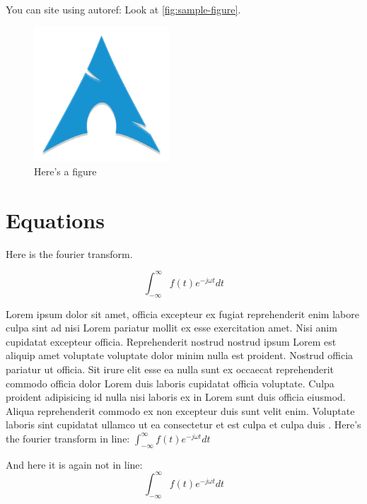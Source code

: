 \documentclass[conference]{IEEEtran}
\begin{document}
You can site using autoref: Look at \autoref{fig:sample-figure}.

\begin{figure}
  \begin{center}
    \includegraphics[width=0.45\textwidth]{./figures/arch-linux-logo-small.png}
  \end{center}
  \caption{Here's a figure}\label{fig:sample-figure}
\end{figure}

\section{Equations}
Here is the fourier transform.

\begin{equation}
  \int_{-\infty}^{\infty} f(t) e^{- j \omega t} dt
  \label{eq:fourier-transform}
\end{equation}

Lorem ipsum dolor sit amet, officia excepteur ex fugiat reprehenderit enim labore culpa sint ad nisi Lorem pariatur mollit ex esse exercitation amet. Nisi anim cupidatat excepteur officia. Reprehenderit nostrud nostrud ipsum Lorem est aliquip amet voluptate voluptate dolor minim nulla est proident. Nostrud officia pariatur ut officia. Sit irure elit esse ea nulla sunt ex occaecat reprehenderit commodo officia dolor Lorem duis laboris cupidatat officia voluptate. Culpa proident adipisicing id nulla nisi laboris ex in Lorem sunt duis officia eiusmod. Aliqua reprehenderit commodo ex non excepteur duis sunt velit enim. Voluptate laboris sint cupidatat ullamco ut ea consectetur et est culpa et culpa duis \cite{sun1090mhz}.
Here's the fourier transform in line: $\int_{-\infty}^{\infty} f(t) e^{- j \omega t} dt$


And here it is again not in line:
$$\int_{-\infty}^{\infty} f(t) e^{- j \omega t} dt$$

\end{document}
